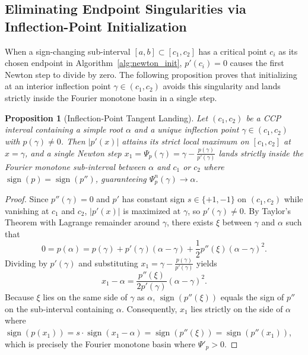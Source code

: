 \documentclass{amsart}
\newtheorem{proposition}{Proposition}
\begin{document}
\subsection{Eliminating Endpoint Singularities via Inflection-Point Initialization}

When a sign-changing sub-interval $[a, b] \subset [c_1, c_2]$ has a critical point $c_i$ as its chosen endpoint in Algorithm~\ref{alg:newton_init}, $p'(c_i) = 0$ causes the first Newton step to divide by zero. The following proposition proves that initializing at an interior inflection point $\gamma \in (c_1, c_2)$ avoids this singularity and lands strictly inside the Fourier monotone basin in a single step.

\begin{proposition}[Inflection-Point Tangent Landing]\label{prop_inflection_init}
    Let $(c_1, c_2)$ be a CCP interval containing a simple root $\alpha$ and a unique inflection point $\gamma \in (c_1, c_2)$ with $p(\gamma) \neq 0$. Then $|p'(x)|$ attains its strict local maximum on $[c_1, c_2]$ at $x = \gamma$, and a single Newton step $x_1 = \Psi_p(\gamma) = \gamma - \frac{p(\gamma)}{p'(\gamma)}$ lands strictly inside the Fourier monotone sub-interval between $\alpha$ and $c_1$ or $c_2$ where $\operatorname{sign}(p) = \operatorname{sign}(p'')$, guaranteeing $\Psi_p^n(\gamma) \to \alpha$.
\end{proposition}
\begin{proof}
    Since $p''(\gamma) = 0$ and $p'$ has constant sign $s \in \{+1, -1\}$ on $(c_1, c_2)$ while vanishing at $c_1$ and $c_2$, $|p'(x)|$ is maximized at $\gamma$, so $p'(\gamma) \neq 0$. By Taylor's Theorem with Lagrange remainder around $\gamma$, there exists $\xi$ between $\gamma$ and $\alpha$ such that
    \[
        0 = p(\alpha) = p(\gamma) + p'(\gamma)(\alpha - \gamma) + \frac{1}{2}p''(\xi)(\alpha - \gamma)^2.
    \]
    Dividing by $p'(\gamma)$ and substituting $x_1 = \gamma - \frac{p(\gamma)}{p'(\gamma)}$ yields
    \[
        x_1 - \alpha = \frac{p''(\xi)}{2p'(\gamma)}(\alpha - \gamma)^2.
    \]
    Because $\xi$ lies on the same side of $\gamma$ as $\alpha$, $\operatorname{sign}(p''(\xi))$ equals the sign of $p''$ on the sub-interval containing $\alpha$. Consequently, $x_1$ lies strictly on the side of $\alpha$ where $\operatorname{sign}(p(x_1)) = s \cdot \operatorname{sign}(x_1 - \alpha) = \operatorname{sign}(p''(\xi)) = \operatorname{sign}(p''(x_1))$, which is precisely the Fourier monotone basin where $\Psi'_p > 0$.
\end{proof}
\end{document}
